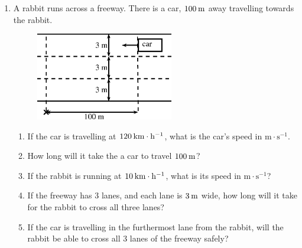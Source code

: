 \begin{enumerate}[noitemsep, label=\textbf{\arabic*}. ]
\begin{figure}[H]
\begin{center}
      \vspace{2pt}
    \vspace{.1in}
    \end{center}
 \end{figure}               \label{m38791*uid51}\item A rabbit runs across a freeway. There is a car, $100\phantom{\rule{2pt}{0ex}}\mathrm{m}$ away travelling towards the rabbit.
    \setcounter{subfigure}{0}
	\begin{figure}[H] %
    \begin{center}
    \label{m38791*id671892!!!underscore!!!media}\label{m38791*id671892!!!underscore!!!printimage}\includegraphics[width=6cm]{col11305.imgs/m38791_PG10C2_019.png} %
      \vspace{2pt}
    \vspace{.1in}
    \end{center}
 \end{figure}       
\label{m38791*id67018}\begin{enumerate}[noitemsep, label=\textbf{\alph*}. ] 
            \label{m38791*uid52}\item If the car is travelling at $120\phantom{\rule{2pt}{0ex}}\mathrm{km}\ensuremath{\cdot}\mathrm{h}{}^{-1}$, what is the car's speed in $\mathrm{m}\ensuremath{\cdot}\mathrm{s}{}^{-1}$.
\label{m38791*uid53}\item How long will it take the a car to travel $100\phantom{\rule{2pt}{0ex}}\mathrm{m}$?
\label{m38791*uid54}\item If the rabbit is running at $10\phantom{\rule{2pt}{0ex}}\mathrm{km}\ensuremath{\cdot}\mathrm{h}{}^{-1}$, what is its speed in $\mathrm{m}\ensuremath{\cdot}\mathrm{s}{}^{-1}$?
\label{m38791*uid55}\item If the freeway has 3 lanes, and each lane is $3\phantom{\rule{2pt}{0ex}}\mathrm{m}$ wide, how long will it take for the rabbit to cross all three lanes?
\label{m38791*uid56}\item If the car is travelling in the furthermost lane from the rabbit, will the rabbit be able to cross all 3 lanes of the freeway safely?
\end{enumerate}
                \end{enumerate}
